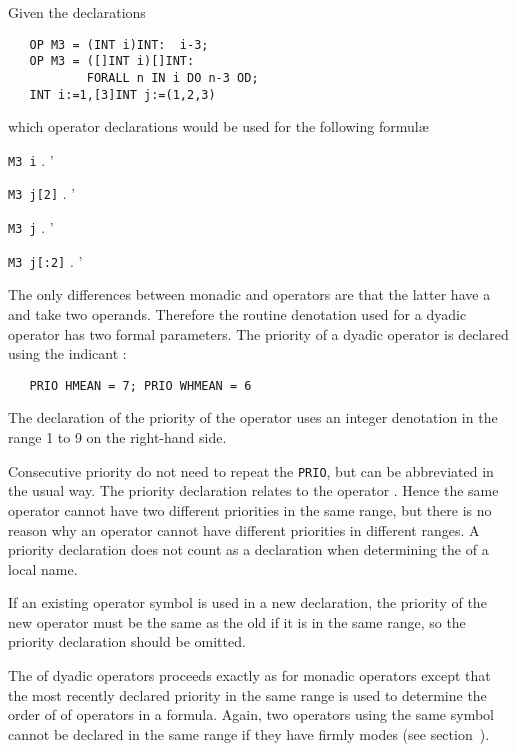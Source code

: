 \begin{exercise}
\item Given the declarations
\begin{verbatim}
   OP M3 = (INT i)INT:  i-3;
   OP M3 = ([]INT i)[]INT:
           FORALL n IN i DO n-3 OD;
   INT i:=1,[3]INT j:=(1,2,3)
\end{verbatim}
\noindent
which operator declarations would be used for the following
formul\ae{}
\begin{subex}
\item \verb|M3 i| .
'
\item \verb|M3 j[2]| .
'
\item \verb|M3 j| .
'
\item \verb|M3 j[:2]| .
'
\end{subex}
\end{exercise}

The only differences between monadic and 
operators are that the latter have a 
and take two operands. Therefore the routine denotation used for a
dyadic operator has two formal parameters. The priority of a dyadic
operator is declared using the indicant :
\begin{verbatim}
   PRIO HMEAN = 7; PRIO WHMEAN = 6
\end{verbatim}
\noindent
The declaration of the priority of the operator uses an integer
denotation in the range 1 to 9 on the right-hand side.

Consecutive priority  do
not need to repeat the \verb|PRIO|, but can be abbreviated in the
usual way.  The priority declaration relates to the operator
.  Hence the same operator cannot
have two different priorities in the same range, but there is no
reason why an operator cannot have different priorities in different
ranges.  A priority declaration does not count as a declaration when
determining the  of a local name.

If an existing operator symbol is used in a new declaration, the
priority of the new operator must be the same as the old if it is in
the same range, so the priority declaration should be omitted.

The  of dyadic
operators proceeds exactly as for monadic operators except that the
most recently declared priority in the same range is used to
determine the order of  of
operators in a formula.  Again, two operators using the same symbol
cannot be declared in the same range if they have firmly
 modes (see section~).

